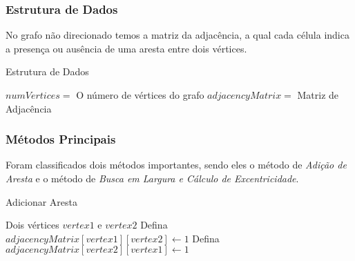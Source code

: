 \documentclass[12pt]{article}
\begin{document}
\subsubsection{Estrutura de Dados}
No grafo não direcionado temos a matriz da adjacência, a qual cada célula indica a presença ou ausência de uma aresta entre dois vértices.

\begin{algorithm}
    \caption{Estrutura de Dados}
    \label{alg:estruturaDeDados_GND}
    \begin{algorithmic}
        \State $numVertices =$ O número de vértices do grafo 
        \State $adjacencyMatrix =$ Matriz de Adjacência
    \end{algorithmic}
\end{algorithm}

\newpage

\subsubsection{Métodos Principais}
Foram classificados dois métodos importantes, sendo eles o método de \textit{Adição de Aresta} e o método de \textit{Busca em Largura e Cálculo de Excentricidade}.

\begin{algorithm}
    \caption{Adicionar Aresta}
    \label{alg:adicionarAresta_GND}
    \begin{algorithmic}
        \Require Dois vértices $vertex1$ e $vertex2$
        \State Defina $adjacencyMatrix[vertex1][vertex2] \gets 1$
        \State Defina $adjacencyMatrix[vertex2][vertex1] \gets 1$
    \end{algorithmic}
\end{algorithm}
\end{document}
